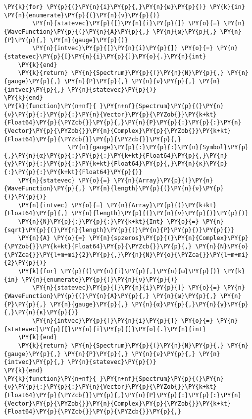 \begin{Verbatim}[commandchars=\\\{\}]
    \PY{k}{for} \PY{p}{(}\PY{n}{i}\PY{p}{,}\PY{n}{ω}\PY{p}{)} \PY{k}{in} \PY{n}{enumerate}\PY{p}{(}\PY{n}{ν}\PY{p}{)}
        \PY{n}{statevec}\PY{p}{[}\PY{n}{i}\PY{p}{]} \PY{o}{=} \PY{n}{WaveFunction}\PY{p}{(}\PY{n}{A}\PY{p}{,} \PY{n}{ω}\PY{p}{,} \PY{n}{P}\PY{p}{,} \PY{n}{gauge}\PY{p}{)}
        \PY{n}{intvec}\PY{p}{[}\PY{n}{i}\PY{p}{]} \PY{o}{=} \PY{n}{statevec}\PY{p}{[}\PY{n}{i}\PY{p}{]}\PY{o}{.}\PY{n}{int}
    \PY{k}{end}
    \PY{k}{return} \PY{n}{Spectrum}\PY{p}{(}\PY{n}{N}\PY{p}{,} \PY{n}{gauge}\PY{p}{,} \PY{n}{P}\PY{p}{,} \PY{n}{ν}\PY{p}{,} \PY{n}{intvec}\PY{p}{,} \PY{n}{statevec}\PY{p}{)}
\PY{k}{end}
\PY{k}{function}\PY{n+nf}{ }\PY{n+nf}{Spectrum}\PY{p}{(}\PY{n}{ν}\PY{p}{:}\PY{p}{:}\PY{n}{Vector}\PY{p}{\PYZob{}}\PY{k+kt}{Float64}\PY{p}{\PYZcb{}}\PY{p}{,}\PY{n}{P}\PY{p}{:}\PY{p}{:}\PY{n}{Vector}\PY{p}{\PYZob{}}\PY{n}{Complex}\PY{p}{\PYZob{}}\PY{k+kt}{Float64}\PY{p}{\PYZcb{}}\PY{p}{\PYZcb{}}\PY{p}{,}
                  \PY{n}{gauge}\PY{p}{:}\PY{p}{:}\PY{n}{Symbol}\PY{p}{,}\PY{n}{α}\PY{p}{:}\PY{p}{:}\PY{k+kt}{Float64}\PY{p}{,}\PY{n}{γ}\PY{p}{:}\PY{p}{:}\PY{k+kt}{Float64}\PY{p}{,}\PY{n}{κ}\PY{p}{:}\PY{p}{:}\PY{k+kt}{Float64}\PY{p}{)}
    \PY{n}{statevec} \PY{o}{=} \PY{n}{Array}\PY{p}{(}\PY{n}{WaveFunction}\PY{p}{,} \PY{n}{length}\PY{p}{(}\PY{n}{ν}\PY{p}{)}\PY{p}{)}
    \PY{n}{intvec} \PY{o}{=} \PY{n}{Array}\PY{p}{(}\PY{k+kt}{Float64}\PY{p}{,} \PY{n}{length}\PY{p}{(}\PY{n}{ν}\PY{p}{)}\PY{p}{)}
    \PY{n}{N}\PY{p}{:}\PY{p}{:}\PY{k+kt}{Int} \PY{o}{=} \PY{n}{sqrt}\PY{p}{(}\PY{n}{length}\PY{p}{(}\PY{n}{P}\PY{p}{)}\PY{p}{)}
    \PY{n}{A} \PY{o}{=} \PY{n}{spzeros}\PY{p}{(}\PY{n}{Complex}\PY{p}{\PYZob{}}\PY{k+kt}{Float64}\PY{p}{\PYZcb{}}\PY{p}{,} \PY{n}{N}\PY{o}{\PYZca{}}\PY{l+m+mi}{2}\PY{p}{,}\PY{n}{N}\PY{o}{\PYZca{}}\PY{l+m+mi}{2}\PY{p}{)}
    \PY{k}{for} \PY{p}{(}\PY{n}{i}\PY{p}{,}\PY{n}{ω}\PY{p}{)} \PY{k}{in} \PY{n}{enumerate}\PY{p}{(}\PY{n}{ν}\PY{p}{)}
        \PY{n}{statevec}\PY{p}{[}\PY{n}{i}\PY{p}{]} \PY{o}{=} \PY{n}{WaveFunction}\PY{p}{(}\PY{n}{A}\PY{p}{,} \PY{n}{ω}\PY{p}{,} \PY{n}{P}\PY{p}{,} \PY{n}{gauge}\PY{p}{,} \PY{n}{α}\PY{p}{,}\PY{n}{γ}\PY{p}{,}\PY{n}{κ}\PY{p}{)}
        \PY{n}{intvec}\PY{p}{[}\PY{n}{i}\PY{p}{]} \PY{o}{=} \PY{n}{statevec}\PY{p}{[}\PY{n}{i}\PY{p}{]}\PY{o}{.}\PY{n}{int}
    \PY{k}{end}
    \PY{k}{return} \PY{n}{Spectrum}\PY{p}{(}\PY{n}{N}\PY{p}{,} \PY{n}{gauge}\PY{p}{,} \PY{n}{P}\PY{p}{,} \PY{n}{ν}\PY{p}{,} \PY{n}{intvec}\PY{p}{,} \PY{n}{statevec}\PY{p}{)}
\PY{k}{end}
\PY{k}{function}\PY{n+nf}{ }\PY{n+nf}{Spectrum}\PY{p}{(}\PY{n}{ν}\PY{p}{:}\PY{p}{:}\PY{n}{Vector}\PY{p}{\PYZob{}}\PY{k+kt}{Float64}\PY{p}{\PYZcb{}}\PY{p}{,}\PY{n}{P}\PY{p}{:}\PY{p}{:}\PY{n}{Vector}\PY{p}{\PYZob{}}\PY{n}{Complex}\PY{p}{\PYZob{}}\PY{k+kt}{Float64}\PY{p}{\PYZcb{}}\PY{p}{\PYZcb{}}\PY{p}{,}

\end{Verbatim}
